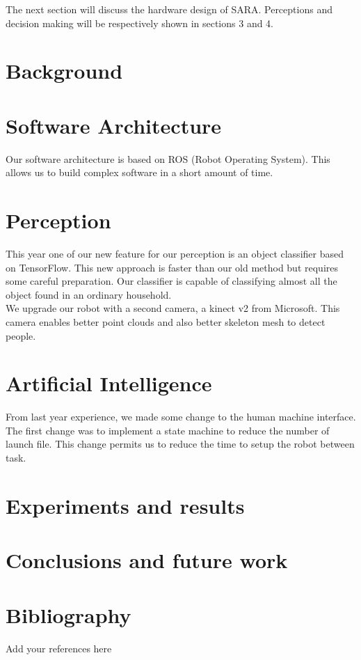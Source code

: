 \documentclass[runningheads,a4paper]{llncs}
\begin{document}
The next section will discuss the hardware design of SARA. Perceptions and decision making will be respectively shown in sections 3 and 4.


\section{Background}
\lipsum[1-3]

\section{Software Architecture}
\tab Our software architecture is based on ROS (Robot Operating System). This allows us to build complex software in a short amount of time. 

\section{Perception}

\tab This year one of our new feature for our perception is an object classifier based on TensorFlow. This new approach is faster than our old method but requires some careful preparation. Our classifier is capable of classifying almost all the object found in an ordinary household. \\

We upgrade our robot with a second camera, a kinect v2 from Microsoft. This camera enables better point clouds and also better skeleton mesh to detect people. \\

\section{Artificial Intelligence}
\tab From last year experience, we made some change to the human machine interface. \\

The first change was to implement a state machine to reduce the number of launch file. This change permits us to reduce the time to setup the robot between task. 



\section{Experiments and results}
\lipsum[15-20]

\section{Conclusions and future work}
\lipsum[21-24]

\section*{Bibliography}
Add your references here
%
%

\newpage

\end{document}
